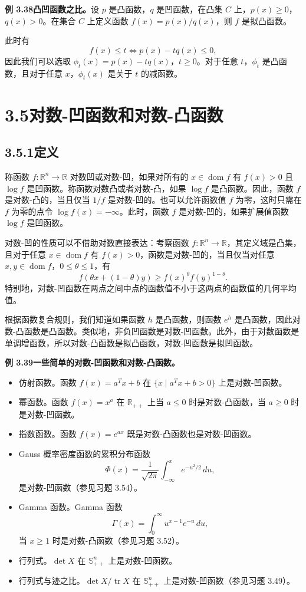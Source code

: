\documentclass[UTF8,12pt,a4paper,fontset=fandol]{ctexart}
\DeclareMathOperator{\dom}{dom}
\begin{document}
\noindent\textbf{例 3.38\quad 凸凹函数之比。}\quad 设 $p$ 是凸函数，$q$ 是凹函数，在凸集 $C$ 上，$p(x)\geq0$，$q(x)>0$。在集合 $C$ 上定义函数 $f(x)=p(x)/q(x)$，则 $f$ 是拟凸函数。

此时有
\[
f(x)\leq t\Longleftrightarrow p(x)-tq(x)\leq0,
\]
因此我们可以选取 $\phi_t(x)=p(x)-tq(x)$，$t\geq0$。对于任意 $t$，$\phi_t$ 是凸函数，且对于任意 $x$，$\phi_t(x)$ 是关于 $t$ 的减函数。

\section*{3.5\quad 对数-凹函数和对数-凸函数}

\subsection*{3.5.1\quad 定义}

称函数 $f:\mathbb{R}^n\to\mathbb{R}$ 对数凹或对数-凹，如果对所有的 $x\in\dom f$ 有 $f(x)>0$ 且 $\log f$ 是凹函数。称函数对数凸或者对数-凸，如果 $\log f$ 是凸函数。因此，函数 $f$ 是对数-凸的，当且仅当 $1/f$ 是对数-凹的。也可以允许函数值 $f$ 为零，这时只需在 $f$ 为零的点令 $\log f(x)=-\infty$。此时，函数 $f$ 是对数-凹的，如果扩展值函数 $\log f$ 是凹函数。

对数-凹的性质可以不借助对数直接表达：考察函数 $f:\mathbb{R}^n\to\mathbb{R}$，其定义域是凸集，且对于任意 $x\in\dom f$ 有 $f(x)>0$，函数是对数-凹的，当且仅当对任意 $x,y\in\dom f$，$0\leq\theta\leq1$，有
\[
f(\theta x+(1-\theta)y)\geq f(x)^\theta f(y)^{1-\theta}.
\]
特别地，对数-凹函数在两点之间中点的函数值不小于这两点的函数值的几何平均值。

根据函数复合规则，我们知道如果函数 $h$ 是凸函数，则函数 $e^h$ 是凸函数，因此对数-凸函数是凸函数。类似地，非负凹函数是对数-凹函数。此外，由于对数函数是单调增函数，所以对数-凸函数是拟凸函数，对数-凹函数是拟凹函数。

\noindent\textbf{例 3.39\quad 一些简单的对数-凹函数和对数-凸函数。}
\begin{itemize}
\item 仿射函数。函数 $f(x)=a^Tx+b$ 在 $\{x\mid a^Tx+b>0\}$ 上是对数-凹函数。
\item 幂函数。函数 $f(x)=x^a$ 在 $\mathbb{R}_{++}$ 上当 $a\leq0$ 时是对数-凸函数，当 $a\geq0$ 时是对数-凹函数。
\item 指数函数。函数 $f(x)=e^{ax}$ 既是对数-凸函数也是对数-凹函数。
\item Gauss 概率密度函数的累积分布函数
\[
\Phi(x)=\frac{1}{\sqrt{2\pi}}\int_{-\infty}^x e^{-u^2/2}\,du,
\]
是对数-凹函数（参见习题 3.54）。
\item Gamma 函数。Gamma 函数
\[
\Gamma(x)=\int_0^\infty u^{x-1}e^{-u}\,du,
\]
当 $x\geq1$ 时是对数-凸函数（参见习题 3.52）。
\item 行列式。$\det X$ 在 $\mathbb{S}_{++}^n$ 上是对数-凹函数。
\item 行列式与迹之比。$\det X/\operatorname{tr}X$ 在 $\mathbb{S}_{++}^n$ 上是对数-凹函数（参见习题 3.49）。
\end{itemize}
\end{document}
